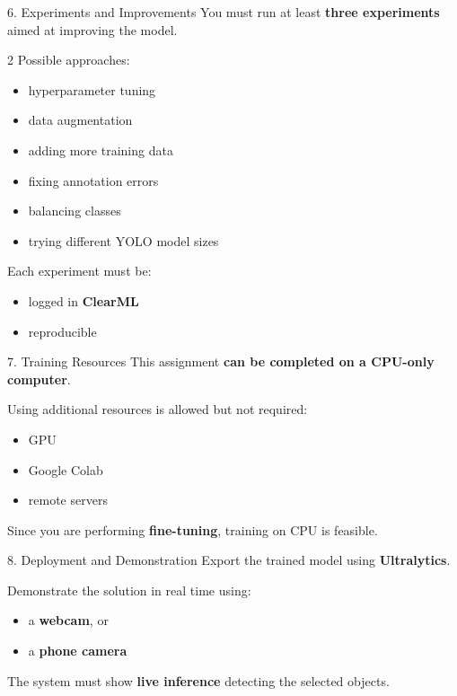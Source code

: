 \documentclass[aspectratio=169]{beamer}
\begin{document}
\begin{frame}[t]{6. Experiments and Improvements}
You must run at least \textbf{three experiments} aimed at improving the model.
\begin{multicols}{2}
Possible approaches:

\begin{itemize}
\item hyperparameter tuning
\item data augmentation
\item adding more training data
\item fixing annotation errors
\item balancing classes
\item trying different YOLO model sizes
\end{itemize}

Each experiment must be:
\begin{itemize}
\item logged in \textbf{ClearML}
\item reproducible
\end{itemize}
\end{multicols}

\end{frame}


\begin{frame}[t]{7. Training Resources}
This assignment \textbf{can be completed on a CPU-only computer}.

Using additional resources is allowed but not required:

\begin{itemize}
\item GPU
\item Google Colab
\item remote servers
\end{itemize}

Since you are performing \textbf{fine-tuning}, training on CPU is feasible.
\end{frame}


\begin{frame}[t]{8. Deployment and Demonstration}
Export the trained model using \textbf{Ultralytics}.

Demonstrate the solution in real time using:

\begin{itemize}
\item a \textbf{webcam}, or
\item a \textbf{phone camera}
\end{itemize}

The system must show \textbf{live inference} detecting the selected objects.
\end{frame}
\end{document}

